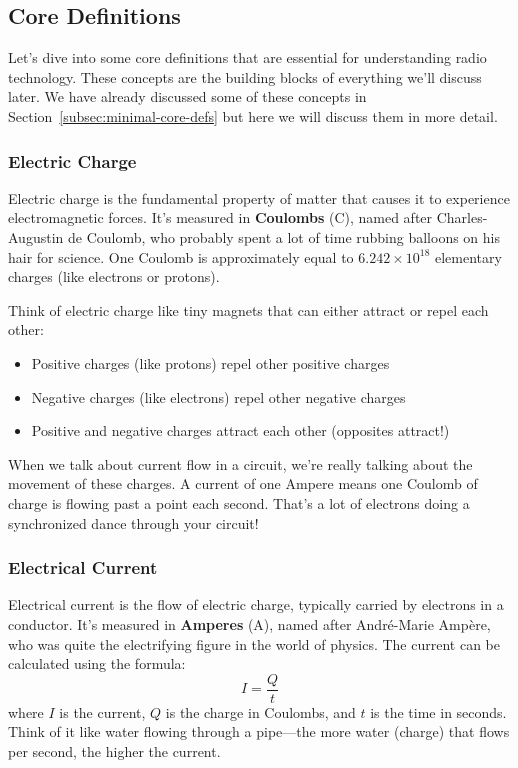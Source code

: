 \subsection{Core Definitions}
\label{subsec:core-defs}

Let's dive into some core definitions that are essential for understanding radio technology. These concepts are the building blocks of everything we'll discuss later. We have already discussed some of these concepts in Section~\ref{subsec:minimal-core-defs} but here we will discuss them in more detail.

\subsubsection*{Electric Charge}
Electric charge is the fundamental property of matter that causes it to experience electromagnetic forces. It's measured in \textbf{Coulombs} (C), named after Charles-Augustin de Coulomb, who probably spent a lot of time rubbing balloons on his hair for science. One Coulomb is approximately equal to \(6.242 \times 10^{18}\) elementary charges (like electrons or protons).

Think of electric charge like tiny magnets that can either attract or repel each other:
\begin{itemize}[noitemsep]
    \item Positive charges (like protons) repel other positive charges
    \item Negative charges (like electrons) repel other negative charges
    \item Positive and negative charges attract each other (opposites attract!)
\end{itemize}

When we talk about current flow in a circuit, we're really talking about the movement of these charges. A current of one Ampere means one Coulomb of charge is flowing past a point each second. That's a lot of electrons doing a synchronized dance through your circuit!

\subsubsection*{Electrical Current}
Electrical current is the flow of electric charge, typically carried by electrons in a conductor. It's measured in \textbf{Amperes} (A), named after André-Marie Ampère, who was quite the electrifying figure in the world of physics. The current can be calculated using the formula:
\begin{equation}
    I = \frac{Q}{t}
    \label{eq:current}
\end{equation}
where \( I \) is the current, \( Q \) is the charge in Coulombs, and \( t \) is the time in seconds. Think of it like water flowing through a pipe—the more water (charge) that flows per second, the higher the current.

